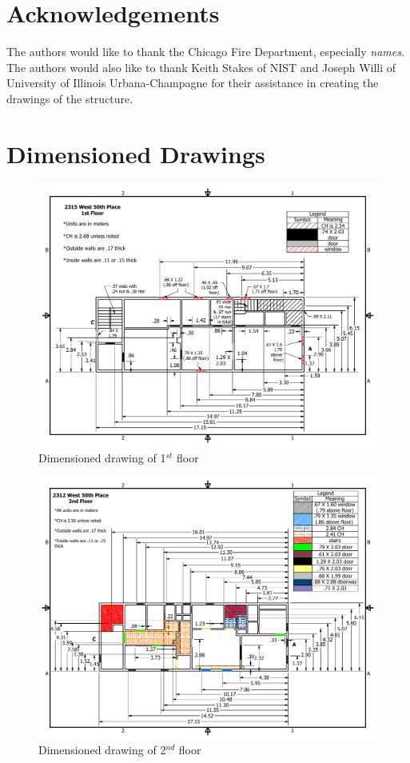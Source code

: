 \documentclass[11pt,oneside]{book}
\begin{document}
\chapter{Acknowledgements}
The authors would like to thank the Chicago Fire Department, especially {\em names}. The authors would also like to thank Keith Stakes of NIST and Joseph Willi of University of Illinois Urbana-Champagne for their assistance in creating the drawings of the structure.




\appendix

\chapter{Dimensioned Drawings}

\begin{figure}[h!]
\centering
\includegraphics[width=.80\textwidth]{../Figures/50th_Place_1st_Floor}
\caption {Dimensioned drawing of 1$^{st}$ floor}
\label{fig:first_floor}
\end{figure}

\begin{figure}[h!]
\centering
\includegraphics[width=.80\textwidth]{../Figures/50th_Place_2nd_Floor}
\caption {Dimensioned drawing of 2$^{nd}$ floor}
\label{fig:second_floor}
\end{figure}
\end{document}
